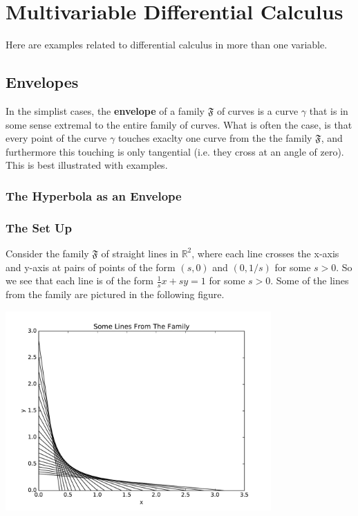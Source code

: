 \section{Multivariable Differential Calculus}

Here are examples related to differential calculus in more than one variable.

\subsection{Envelopes}

In the simplist cases, the \textbf{envelope} of a family \(\mathfrak F\) of curves is a curve \(\gamma\) that is in some sense extremal to the entire family of curves. 
What is often the case, is that every point of the curve \(\gamma\) touches exaclty one curve from the the family \(\mathfrak F\), and furthermore this touching is only tangential (i.e. they cross at an angle of zero). 
This is best illustrated with examples. 

\subsubsection{The Hyperbola as an Envelope}

\subsubsection*{The Set Up}

Consider the family \(\mathfrak F\) of straight lines in \(\mathbb R^2\), where each line crosses the x-axis and y-axis at pairs of points of the form \((s,0)\) and \((0, 1/s)\) for some \(s > 0\). 
So we see that each line is of the form \(\frac{1}{s} x + s y = 1\) for some \(s > 0\).
Some of the lines from the family are pictured in the following figure.

\includegraphics[width = 4.0in]{multiVarDiffCalc/hyperbolaFamily.pdf}

